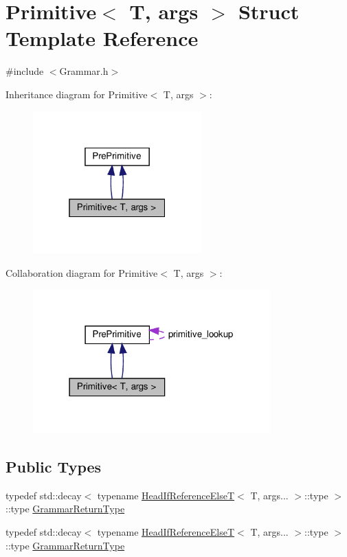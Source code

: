 \hypertarget{struct_primitive}{}\section{Primitive$<$ T, args $>$ Struct Template Reference}
\label{struct_primitive}


{\ttfamily \#include $<$Grammar.\+h$>$}



Inheritance diagram for Primitive$<$ T, args $>$\+:\nopagebreak
\begin{figure}[H]
\begin{center}
\leavevmode
\includegraphics[width=184pt]{struct_primitive__inherit__graph}
\end{center}
\end{figure}


Collaboration diagram for Primitive$<$ T, args $>$\+:\nopagebreak
\begin{figure}[H]
\begin{center}
\leavevmode
\includegraphics[width=259pt]{struct_primitive__coll__graph}
\end{center}
\end{figure}
\subsection*{Public Types}
\begin{DoxyCompactItemize}
\item 
typedef std\+::decay$<$ typename \hyperlink{struct_head_if_reference_else_t}{Head\+If\+Reference\+ElseT}$<$ T, args... $>$\+::type $>$\+::type \hyperlink{struct_primitive_a1f2d2db3fb7869d03d65112e30d22101}{Grammar\+Return\+Type}
\item 
typedef std\+::decay$<$ typename \hyperlink{struct_head_if_reference_else_t}{Head\+If\+Reference\+ElseT}$<$ T, args... $>$\+::type $>$\+::type \hyperlink{struct_primitive_a1f2d2db3fb7869d03d65112e30d22101}{Grammar\+Return\+Type}
\end{DoxyCompactItemize}

